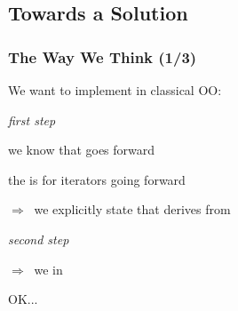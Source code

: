 \subsection{Towards a Solution}


\begin{frame}
  \frametitle{The Way We Think (1/3)}

We want to implement \bfarrayiteratorT in classical OO:

\bigskip

\begin{enumerate}
{\scriptsize{

\item[] \textit{first step}
\smallskip
\item we know that \bfarrayiteratorT goes forward
\item the \bfForwardIterator {\color{red}{ abstract class}} is for iterators going forward
\item $\Rightarrow ~ $ we {\color{mediumgreen}explicitly} state that \bfarrayiteratorT derives from \bfForwardIterator

\medskip
\item[] \textit{second step}
\smallskip

\item \bfForwardIterator {\color{red}{ declares}} \bfnext
\item $\Rightarrow ~ $ we {\color{red}{define}} \bfnext in \bfarrayiteratorT

}}
\end{enumerate}

\bigskip

OK...

\end{frame}



